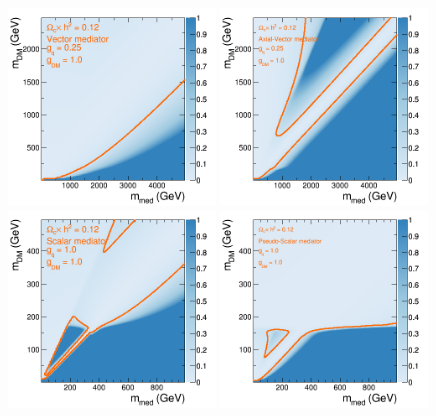 \begin{center}
\begin{figure}[h]
\includegraphics[width=0.49\textwidth]{figures/scan_V_g25_MD_xxd_V_gq25.png} 
\includegraphics[width=0.49\textwidth]{figures/scan_A_g25_MD_xxd_A_gq25.png} \\
\includegraphics[width=0.49\textwidth]{figures/scan_S_g1_MD_xxd_S_gq1.png} 
\includegraphics[width=0.49\textwidth]{figures/scan_P_g1_MD_xxd_P_gq1.png} \\

\end{figure}
\end{center}
